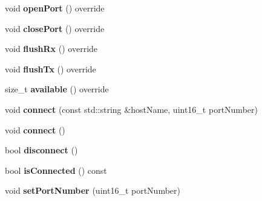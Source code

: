 \begin{DoxyCompactItemize}
void {\bfseries open\+Port} () override
\item 
\mbox{\label{class_cpp_serial_port_1_1_abstract_socket_a8aadacd13b08fc39f964bc57dc3e520d}} 
void {\bfseries close\+Port} () override
\item 
\mbox{\label{class_cpp_serial_port_1_1_abstract_socket_a3270290451ac61f4ed4499d35d28a97c}} 
void {\bfseries flush\+Rx} () override
\item 
\mbox{\label{class_cpp_serial_port_1_1_abstract_socket_a56c572096cf20273e1a005914f138c9f}} 
void {\bfseries flush\+Tx} () override
\item 
\mbox{\label{class_cpp_serial_port_1_1_abstract_socket_a63ed2eb01fb5612329e0d59168eb952e}} 
size\+\_\+t {\bfseries available} () override
\item 
\mbox{\label{class_cpp_serial_port_1_1_abstract_socket_a91f8b676933e2e28553fdc2ec9d704c0}} 
void {\bfseries connect} (const std\+::string \&host\+Name, uint16\+\_\+t port\+Number)
\item 
\mbox{\label{class_cpp_serial_port_1_1_abstract_socket_a8598bbc22576ba36d2fb17f959d0b4af}} 
void {\bfseries connect} ()
\item 
\mbox{\label{class_cpp_serial_port_1_1_abstract_socket_a45cb0952ab5cdc8ffe0af83731e2a521}} 
bool {\bfseries disconnect} ()
\item 
\mbox{\label{class_cpp_serial_port_1_1_abstract_socket_adddb888722410a5c80ca31598d78bdf0}} 
bool {\bfseries is\+Connected} () const
\item 
\mbox{\label{class_cpp_serial_port_1_1_abstract_socket_a8f9e2bab08e06124eb94e853254b0e4b}} 
void {\bfseries set\+Port\+Number} (uint16\+\_\+t port\+Number)
\item 
\mbox{\label{class_cpp_serial_port_1_1_abstract_socket_ac281aef8c2f339f750406b3b45987e9b}} 

\end{DoxyCompactItemize}
